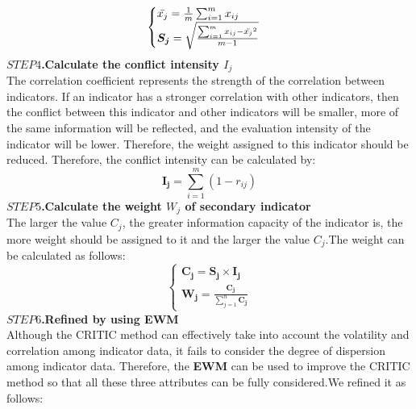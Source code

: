 \documentclass[12pt]{article}
\begin{document}
\begin{equation}
	\begin{cases}
		\Bar{x_j}=\frac{1}{m}\sum_{i=1}^m x_{ij} \\
		\boldsymbol{S_j}=\sqrt{\frac{\sum_{i=1}^m {x_{ij}-\Bar{x_j}}^2}{m-1}}
	\end{cases}
\end{equation}
\textbf{$STEP4$.Calculate the conflict intensity $I_j$}\\
\hspace{2em}The correlation coefficient represents the strength of the correlation between indicators. If an indicator has a stronger correlation with other indicators, then the conflict between this indicator and other indicators will be smaller, more of the same information will be reflected, and the evaluation intensity of the indicator will be lower. Therefore, the weight assigned to this indicator should be reduced. Therefore, the conflict intensity can be calculated by:
\begin{equation}
	\boldsymbol{I_j}=\sum_{i=1}^m (1-r_{ij})
\end{equation}
\textbf{$STEP5$.Calculate the weight $W_j$ of secondary indicator}\\
The larger the value $C_j$, the greater information capacity of the indicator is, the more weight should be assigned to it and the larger the value $C_j$.The weight can be calculated as follows:
\begin{equation}
	\begin{cases}
		\boldsymbol{C_j}=\boldsymbol{S_j}\times\boldsymbol{I_j} \\
		\boldsymbol{W_j}=\frac{\boldsymbol{C_j}}{\sum_{j=1}^n \boldsymbol{C_j}}
	\end{cases}
\end{equation}
\textbf{$STEP6$.Refined by using EWM}\\
\hspace{2em}Although the CRITIC method can effectively take into account the volatility and correlation among indicator data, it fails to consider the degree of dispersion among indicator data. Therefore, the \textbf{EWM} can be used to improve the CRITIC method so that all these three attributes can be fully considered.We refined it as follows:
\end{document}
